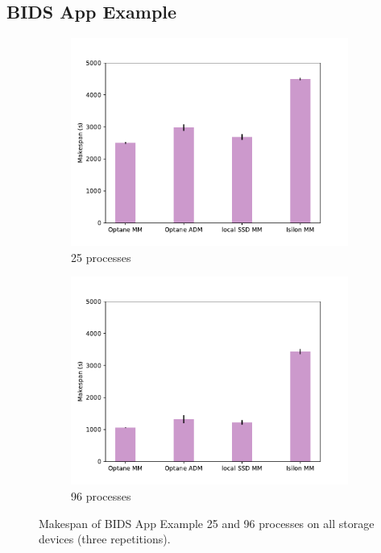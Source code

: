 \subsection{BIDS App Example}
\begin{figure}
    \begin{subfigure}{0.5\textwidth}
        \centering
    \includegraphics[width=\columnwidth]{figures/optane/25cores.pdf}
    \caption{25 processes}\label{fig:optane:bm25}
\end{subfigure}
    \begin{subfigure}{0.5\textwidth}
        \centering
    \includegraphics[width=\columnwidth]{figures/optane/96cores.pdf}
    \caption{96 processes}\label{fig:optane:bm96}
\end{subfigure}
\caption{Makespan of BIDS App Example 25 and 96 processes on all storage devices (three repetitions).}
\captionsetup{belowskip=-10pt}
\end{figure}

